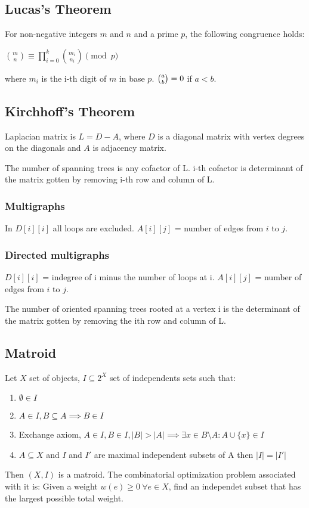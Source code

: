 \documentclass[a4paper,10pt,oneside]{article}
\begin{document}
\begin{multicols}{2}
\subsection{Lucas's Theorem}
For non-negative integers $m$ and $n$ and a prime $p$, the following congruence holds:

$\displaystyle \binom{m}{n} \equiv \prod_{i = 0}^{k} \binom{m_i}{n_i} \pmod p$

where $m_i$ is the i-th digit of $m$ in base $p$. ${\displaystyle {\tbinom {a}{b}}=0}$ if $a < b$.

\subsection{Kirchhoff's Theorem}
Laplacian matrix is $L = D - A$, where $D$ is a diagonal matrix with vertex degrees on the diagonals and $A$ is adjacency matrix.

The number of spanning trees is any cofactor of L. i-th cofactor is determinant of the matrix gotten by removing i-th row and column of L.

\subsubsection{Multigraphs}
In $D[i][i]$ all loops are excluded. $A[i][j]$ = number of edges from $i$ to $j$.

\subsubsection{Directed multigraphs}
$D[i][i]$ = indegree of i minus the number of loops at i. $A[i][j]$ = number of edges from $i$ to $j$.

The number of oriented spanning trees rooted at a vertex i is the determinant of the matrix gotten by removing the ith row and column of L.

\subsection{Matroid}
Let $X$ set of objects, $I \subseteq 2^X$ set of independents sets such that:
\begin{enumerate}
\item $\emptyset \in I$
\item $A \in I, B \subseteq A \implies B \in I$
\item Exchange axiom, $A \in I, B \in I, |B| > |A| \implies \exists x \in B \setminus A : A \cup \{x\} \in I$
\item $A \subseteq X$ and $I$ and $I'$ are maximal independent subsets of A then $|I| = |I'|$
\end{enumerate}
Then $(X, I)$ is a matroid. The combinatorial optimization problem associated with it is: Given a weight $w(e) \geq 0 ~\forall e \in X$, find an independet subset that has the largest possible total weight.


\end{multicols}
\end{document}

